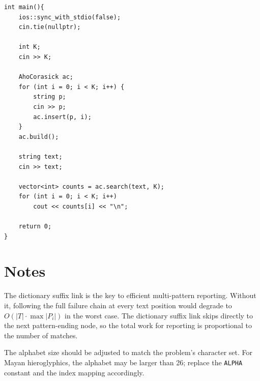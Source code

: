 \documentclass[11pt,a4paper]{article}
\begin{document}
\begin{lstlisting}
int main(){
    ios::sync_with_stdio(false);
    cin.tie(nullptr);

    int K;
    cin >> K;

    AhoCorasick ac;
    for (int i = 0; i < K; i++) {
        string p;
        cin >> p;
        ac.insert(p, i);
    }
    ac.build();

    string text;
    cin >> text;

    vector<int> counts = ac.search(text, K);
    for (int i = 0; i < K; i++)
        cout << counts[i] << "\n";

    return 0;
}
\end{lstlisting}

\section{Notes}
The dictionary suffix link is the key to efficient multi-pattern reporting. Without it, following the full failure chain at every text position would degrade to $O(|T| \cdot \max|P_i|)$ in the worst case. The dictionary suffix link skips directly to the next pattern-ending node, so the total work for reporting is proportional to the number of matches.

The alphabet size should be adjusted to match the problem's character set. For Mayan hieroglyphics, the alphabet may be larger than 26; replace the \texttt{ALPHA} constant and the index mapping accordingly.
\end{document}
